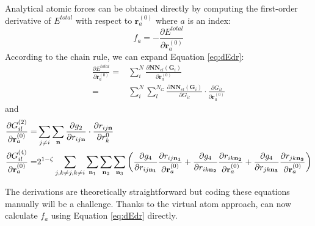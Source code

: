 \documentclass[prb,preprint]{revtex4-2}
\begin{document}
Analytical atomic forces can be obtained directly by computing the first-order 
derivative of $E^{total}$ with respect to $\mathbf{r}_{a}^{(0)}$ where $a$ is an 
index:
\begin{equation}
\label{eq:dEdr}
f_a = -\frac{\partial E^{total}}{\partial \mathbf{r}_a^{(0)}}
\end{equation}
According to the chain rule, we can expand Equation \ref{eq:dEdr}:
\begin{align}
\frac{\partial E^{total}}{\partial \mathbf{r}_a^{(0)}} = & \sum_{i}^{N}{
    \frac{
        \partial\mathbf{NN}_{el}(\mathbf{G}_i)}{
        \partial \mathbf{r}_a^{(0)}}} \nonumber \\
= & \sum_{i}^{N}{\sum_{l}^{N_G}{
    \frac{\partial \mathbf{NN}_{el}(\mathbf{G}_i)}{\partial G_{il}}
    \cdot
    \frac{\partial G_{il}}{\partial \mathbf{r}_{a}^{(0)}}
}}
\end{align}
and 
\begin{align}
\frac{\partial G_{il}^{(2)}}{\partial \mathbf{r}_{a}^{(0)}} = & \sum_{j \neq i}{
    \sum_{\mathbf{n}}{
        \frac{\partial g_2}{\partial r_{ij\mathbf{n}}}
        \cdot
        \frac{\partial r_{ij\mathbf{n}}}{\partial r_k^{0}}
    }
} \\
\frac{\partial G_{il}^{(4)}}{\partial \mathbf{r}_{a}^{(0)}} = &
2^{1 - \zeta}\sum_{j, k \neq j, k \neq i}{
    \sum_{\mathbf{n}_1}{\sum_{\mathbf{n}_2}{\sum_{\mathbf{n}_3}{
        \left(
            \frac{\partial g_4}{\partial r_{ij\mathbf{n_1}}}
            \frac{\partial r_{ij\mathbf{n_1}}}{\partial \mathbf{r}_{a}^{(0)}} + 
            \frac{\partial g_4}{\partial r_{ik\mathbf{n_2}}}
            \frac{\partial r_{ik\mathbf{n_2}}}{\partial \mathbf{r}_{a}^{(0)}} + 
            \frac{\partial g_4}{\partial r_{jk\mathbf{n_3}}}
            \frac{\partial r_{jk\mathbf{n_3}}}{\partial \mathbf{r}_{a}^{(0)}}
        \right)
    }}}
}
\end{align}

The derivations are theoretically straightforward but coding these equations 
manually will be a challenge\cite{AMP}. Thanks to the virtual atom approach, 
\tensoralloy{} can now calculate $f_a$ using Equation \ref{eq:dEdr} directly.
\end{document}
